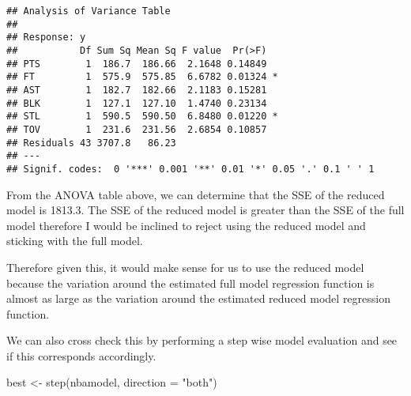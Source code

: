 \documentclass[
]{article}
\newenvironment{Shaded}{\begin{snugshade}}{\end{snugshade}}
\newcommand{\AttributeTok}[1]{\textcolor[rgb]{0.77,0.63,0.00}{#1}}
\newcommand{\FunctionTok}[1]{\textcolor[rgb]{0.00,0.00,0.00}{#1}}
\newcommand{\NormalTok}[1]{#1}
\newcommand{\OtherTok}[1]{\textcolor[rgb]{0.56,0.35,0.01}{#1}}
\newcommand{\StringTok}[1]{\textcolor[rgb]{0.31,0.60,0.02}{#1}}
\begin{document}
\begin{verbatim}
## Analysis of Variance Table
## 
## Response: y
##           Df Sum Sq Mean Sq F value  Pr(>F)  
## PTS        1  186.7  186.66  2.1648 0.14849  
## FT         1  575.9  575.85  6.6782 0.01324 *
## AST        1  182.7  182.66  2.1183 0.15281  
## BLK        1  127.1  127.10  1.4740 0.23134  
## STL        1  590.5  590.50  6.8480 0.01220 *
## TOV        1  231.6  231.56  2.6854 0.10857  
## Residuals 43 3707.8   86.23                  
## ---
## Signif. codes:  0 '***' 0.001 '**' 0.01 '*' 0.05 '.' 0.1 ' ' 1
\end{verbatim}

From the ANOVA table above, we can determine that the SSE of the reduced
model is 1813.3. The SSE of the reduced model is greater than the SSE of
the full model therefore I would be inclined to reject using the reduced
model and sticking with the full model.

Therefore given this, it would make sense for us to use the reduced
model because the variation around the estimated full model regression
function is almost as large as the variation around the estimated
reduced model regression function.

We can also cross check this by performing a step wise model evaluation
and see if this corresponds accordingly.

\begin{Shaded}
\begin{Highlighting}[]
\NormalTok{best }\OtherTok{\textless{}{-}} \FunctionTok{step}\NormalTok{(nbamodel, }\AttributeTok{direction =} \StringTok{"both"}\NormalTok{)}
\end{Highlighting}
\end{Shaded}
\end{document}
